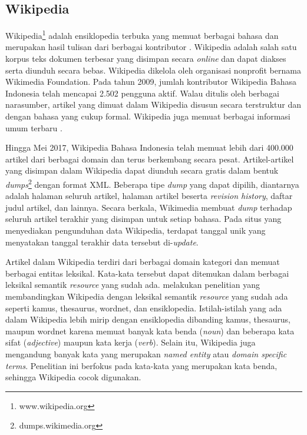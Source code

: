 \subsection{Wikipedia}
Wikipedia\footnote{www.wikipedia.org} adalah ensiklopedia terbuka yang memuat berbagai bahasa dan merupakan hasil tulisan dari berbagai kontributor \citep{denoyer2006wikipedia}. Wikipedia adalah salah satu korpus teks dokumen terbesar yang disimpan secara \textit{online} dan dapat diakses serta diunduh secara bebas. Wikipedia dikelola oleh organisasi nonprofit bernama Wikimedia Foundation. Pada tahun 2009, jumlah kontributor Wikipedia Bahasa Indonesia telah mencapai 2.502 pengguna aktif. Walau ditulis oleh berbagai narasumber, artikel yang dimuat dalam Wikipedia disusun secara terstruktur dan dengan bahasa yang cukup formal. Wikipedia juga memuat berbagai informasi umum terbaru \citep{arnold2014extracting}.

Hingga Mei 2017, Wikipedia Bahasa Indonesia telah memuat lebih dari 400.000 artikel dari berbagai domain dan terus berkembang secara pesat. Artikel-artikel yang disimpan dalam Wikipedia dapat diunduh secara gratis dalam bentuk \textit{dumps}\footnote{dumps.wikimedia.org} dengan format XML. Beberapa tipe \textit{dump} yang dapat dipilih, diantarnya adalah halaman seluruh artikel, halaman artikel beserta \textit{revision history}, daftar judul artikel, dan lainnya. Secara berkala, Wikimedia membuat \textit{dump} terhadap seluruh artikel terakhir yang disimpan untuk setiap bahasa. Pada situs yang menyediakan pengunduhan data Wikipedia, terdapat tanggal unik yang menyatakan tanggal terakhir data tersebut di-\textit{update}.

Artikel dalam Wikipedia terdiri dari berbagai domain kategori dan memuat berbagai entitas leksikal. Kata-kata tersebut dapat ditemukan dalam berbagai leksikal semantik \textit{resource} yang sudah ada. \cite{zesch2007analyzing} melakukan penelitian yang membandingkan Wikipedia dengan leksikal semantik \textit{resource} yang sudah ada seperti kamus, thesaurus, wordnet, dan ensiklopedia. Istilah-istilah yang ada dalam Wikipedia lebih mirip dengan ensiklopedia dibanding kamus, thesaurus, maupun wordnet karena memuat banyak kata benda (\textit{noun}) dan beberapa kata sifat (\textit{adjective}) maupun kata kerja (\textit{verb}). Selain itu, Wikipedia juga mengandung banyak kata yang merupakan \textit{named entity} atau \textit{domain specific terms}. Penelitian ini berfokus pada kata-kata yang merupakan kata benda, sehingga Wikipedia cocok digunakan. 

